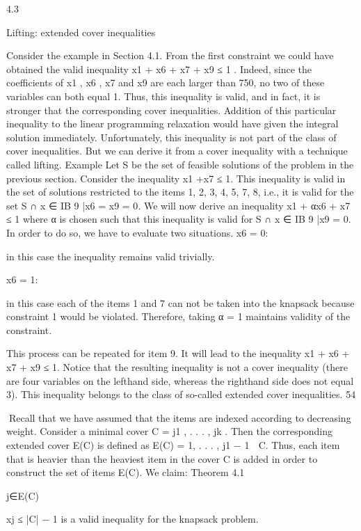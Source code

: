 4.3

Lifting: extended cover inequalities

Consider the example in Section 4.1. From the first constraint we could have obtained the valid inequality
x1 + x6 + x7 + x9 ≤ 1
. Indeed, since the coefficients of x1 , x6 , x7 and x9 are each larger than 750, no two of these variables
can both equal 1. Thus, this inequality is valid, and in fact, it is stronger that the corresponding cover
inequalities. Addition of this particular inequality to the linear programming relaxation would have
given the integral solution immediately. Unfortunately, this inequality is not part of the class of cover
inequalities. But we can derive it from a cover inequality with a technique called lifting.
Example Let S be the set of feasible solutions of the problem in the previous section. Consider the inequality x1 +x7 ≤ 1. This inequality is valid in the set of solutions restricted to the items {1, 2, 3, 4, 5, 7, 8},
i.e., it is valid for the set S ∩ {x ∈ IB 9 |x6 = x9 = 0}. We will now derive an inequality
x1 + αx6 + x7 ≤ 1
where α is chosen such that this inequality is valid for S ∩ {x ∈ IB 9 |x9 = 0}. In order to do so, we have
to evaluate two situations.
x6 = 0:

in this case the inequality remains valid trivially.

x6 = 1:

in this case each of the items 1 and 7 can not be taken into the knapsack because constraint 1
would be violated. Therefore, taking α = 1 maintains validity of the constraint.

This process can be repeated for item 9. It will lead to the inequality
x1 + x6 + x7 + x9 ≤ 1.
Notice that the resulting inequality is not a cover inequality (there are four variables on the lefthand side,
whereas the righthand side does not equal 3). This inequality belongs to the class of so-called extended
cover inequalities.
54

Recall that we have assumed that the items are indexed according to decreasing weight. Consider a
minimal cover C = {j1 , . . . , jk }. Then the corresponding extended cover E(C) is defined as
E(C) = {1, . . . , j1 − 1} ∪ C.
Thus, each item that is heavier than the heaviest item in the cover C is added in order to construct the
set of items E(C). We claim:
Theorem 4.1

j∈E(C)

xj ≤ |C| − 1 is a valid inequality for the knapsack problem.

